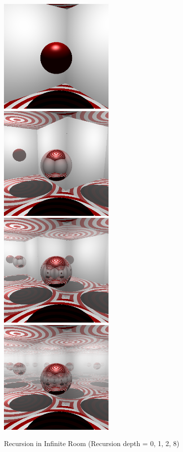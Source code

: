 \documentclass[10pt,a4paper]{report}
\begin{document}
\newpage
\begin{figure}[h!]
\caption{Recursion in Infinite Room (Recursion depth = 0, 1, 2, 8)}
    \includegraphics[width=0.5\textwidth]{02_Exc_Raytracing_Framework/rec0.png}
    \includegraphics[width=0.5\textwidth]{02_Exc_Raytracing_Framework/rec1.png}
        \includegraphics[width=0.5\textwidth]{02_Exc_Raytracing_Framework/rec2.png}
            \includegraphics[width=0.5\textwidth]{02_Exc_Raytracing_Framework/rec8.png}
\end{figure}
\end{document}

